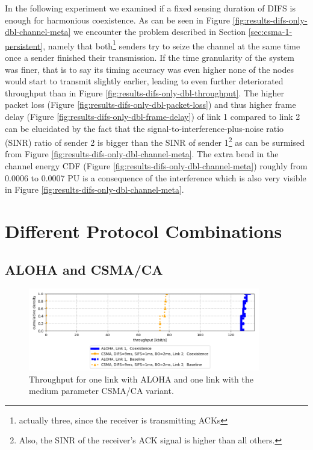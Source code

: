 In the following experiment we examined if a fixed sensing duration of DIFS is enough for harmonious coexistence. As can be seen in Figure \ref{fig:results-difs-only-dbl-channel-meta} we encounter the problem described in Section \ref{sec:csma-1-persistent}, namely that both\footnote{actually three, since the receiver is transmitting ACKs} senders try to seize the channel at the same time once a sender finished their transmission. If the time granularity of the system was finer, that is to say its timing accuracy was even higher none of the nodes would start to transmit slightly earlier, leading to even further deteriorated throughput than in Figure \ref{fig:results-difs-only-dbl-throughput}. The higher packet loss (Figure \ref{fig:results-difs-only-dbl-packet-loss}) and thus higher frame delay (Figure \ref{fig:results-difs-only-dbl-frame-delay}) of link 1 compared to link 2  can be elucidated by the fact that the signal-to-interference-plus-noise ratio (SINR) ratio of sender 2 is bigger than the SINR of sender 1\footnote{Also, the SINR of the receiver's ACK signal is higher than all others.} as can be surmised from Figure \ref{fig:results-difs-only-dbl-channel-meta}. The extra bend in the channel energy CDF (Figure \ref{fig:results-difs-only-dbl-channel-meta}) roughly from 0.0006 to 0.0007 PU is a consequence of the interference which is also very visible in Figure \ref{fig:results-difs-only-dbl-channel-meta}.


\section{Different Protocol Combinations}
\label{sec:different-protocols}

\subsection{ALOHA and CSMA/CA}
\label{sec:aloha-csma}

\begin{figure}[tb]
	\label{fig:results-aloha-csma-throughput}
	\begin{center}
		\includegraphics[width=0.9\textwidth]{pictures/results/different_combinations/aloha_csma/throughput_cdf}
	\end{center}
	\caption{Throughput for one link with ALOHA and one link with the medium parameter CSMA/CA variant.}
\end{figure}

